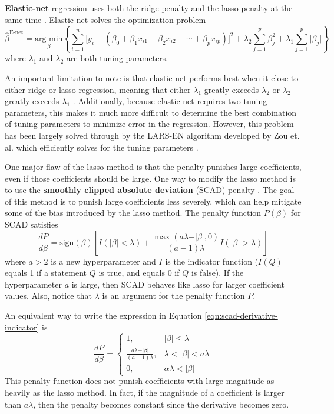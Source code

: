 \documentclass{article}
\newcommand{\argmin}[2]{\underset{#1}{\text{arg min}}\left\{#2\right\}}
\newcommand{\sign}{\text{sign}}
\begin{document}
\textbf{Elastic-net} regression uses both the ridge penalty and the lasso penalty at the same time \cite{zou2005regularization}. Elastic-net solves the optimization problem
\begin{equation}
	\hat{\beta}^{\text{E-net}}=\argmin{\beta}{\sum\limits_{i = 1}^n \Big[y_i - (\beta_0 + \beta_1 x_{i1} + \beta_2 x_{i2} + \cdots + \beta_p x_{ip})\Big]^2 + \lambda_2\sum\limits_{j = 1}^p \beta_j^2 + \lambda_1\sum\limits_{j = 1}^p \vert \beta_j \vert}
\end{equation}
where $\lambda_1$ and $\lambda_2$ are both tuning parameters.

An important limitation to note is that elastic net performs best when it close to either ridge or lasso regression, meaning that either $\lambda_1$ greatly exceeds $\lambda_2$ or $\lambda_2$ greatly exceeds $\lambda_1$ \cite{zou2005regularization}. Additionally, because elastic net requires two tuning parameters, this makes it much more difficult to determine the best combination of tuning parameters to minimize error in the regression. However, this problem has been largely solved through by the LARS-EN algorithm developed by Zou et. al. which efficiently solves for the tuning parameters \cite{zou2005regularization}.

One major flaw of the lasso method is that the penalty punishes large coefficients, even if those coefficients should be large. One way to modify the lasso method is to use the \textbf{smoothly clipped absolute deviation} (SCAD) penalty \cite{fan2001variable}. The goal of this method is to punish large coefficients less severely, which can help mitigate some of the bias introduced by the lasso method. The penalty function $P(\beta)$ for SCAD satisfies
\begin{equation}\label{eqn:scad-derivative-indicator}
	\frac{dP}{d\beta} = \sign(\beta)\left[ I(\vert \beta \vert<\lambda) + \frac{\max(a\lambda - \vert \beta\vert, 0)}{(a - 1)\lambda}I(\vert \beta \vert > \lambda) \right]
\end{equation}
where $a>2$ is a new hyperparameter and $I$ is the indicator function ($I(Q)$ equals 1 if a statement $Q$ is true, and equals 0 if $Q$ is false). If the hyperparameter $a$ is large, then SCAD behaves like lasso for larger coefficient values. Also, notice that $\lambda$ is an argument for the penalty function $P$.

An equivalent way to write the expression in Equation \ref{eqn:scad-derivative-indicator} is
\begin{equation}
	\frac{dP}{d\beta} = \left\{\begin{array}{ll}
		1,&\vert \beta \vert\leq \lambda\\
		\frac{a\lambda - \vert \beta \vert}{(a - 1)\lambda},&\lambda < \vert \beta \vert < a\lambda\\
		0,&\alpha\lambda < \vert \beta \vert
	\end{array}\right.
\end{equation}
This penalty function does not punish coefficients with large magnitude as heavily as the lasso method. In fact, if the magnitude of a coefficient is larger than $a\lambda$, then the penalty becomes constant since the derivative becomes zero.
\end{document}

